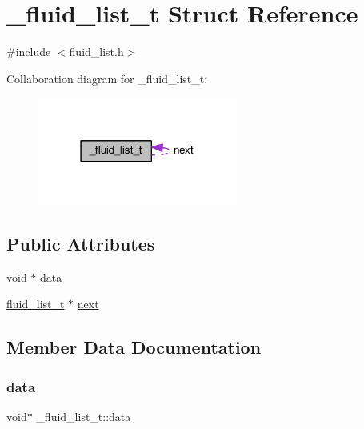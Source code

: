 \hypertarget{struct__fluid__list__t}{}\section{\+\_\+fluid\+\_\+list\+\_\+t Struct Reference}
\label{struct__fluid__list__t}


{\ttfamily \#include $<$fluid\+\_\+list.\+h$>$}



Collaboration diagram for \+\_\+fluid\+\_\+list\+\_\+t\+:
\nopagebreak
\begin{figure}[H]
\begin{center}
\leavevmode
\includegraphics[width=186pt]{struct__fluid__list__t__coll__graph}
\end{center}
\end{figure}
\subsection*{Public Attributes}
\begin{DoxyCompactItemize}
\item 
void $\ast$ \hyperlink{struct__fluid__list__t_a76f4fba75542cd3d105e407195cbd939}{data}
\item 
\hyperlink{fluid__list_8h_a3ef7535d4290862c0af118569223bd89}{fluid\+\_\+list\+\_\+t} $\ast$ \hyperlink{struct__fluid__list__t_a60f4bba688688d1ceabba258a96d3625}{next}
\end{DoxyCompactItemize}


\subsection{Member Data Documentation}
\mbox{\label{struct__fluid__list__t_a76f4fba75542cd3d105e407195cbd939}} 
\subsubsection{\texorpdfstring{data}{data}}
{\footnotesize\ttfamily void$\ast$ \+\_\+fluid\+\_\+list\+\_\+t\+::data}

